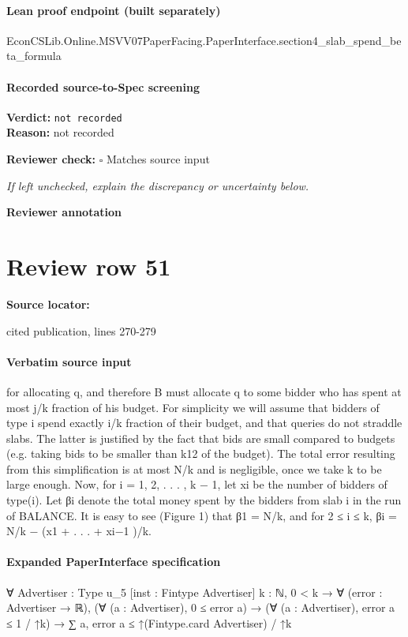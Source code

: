 \documentclass[10pt]{article}
\newcommand{\reviewerbox}{%
  \par\noindent\fbox{\parbox{0.96\linewidth}{\rule{0pt}{0.38in}}}\par
}
\newcommand{\reviewmatch}[1]{%
  \par\noindent\textbf{Reviewer check:} $\square$\; #1\par
  \noindent\emph{If left unchecked, explain the discrepancy or uncertainty below.}\par
}
\begin{document}
\paragraph{Lean proof endpoint (built separately)}\begin{ReviewVerbatim}
EconCSLib.Online.MSVV07PaperFacing.PaperInterface.section4_slab_spend_beta_formula
\end{ReviewVerbatim}

\paragraph{Recorded source-to-Spec screening}
\textbf{Verdict:} \texttt{not recorded}
\\
\textbf{Reason:} not recorded
\reviewmatch{Matches source input}
\noindent\textbf{Reviewer annotation}\par
\reviewerbox
\clearpage
\hypertarget{source-claim-cde484128ac64433}{}
\section*{Review row 51}
\textbf{Source locator:} {\footnotesize\raggedright cited publication, lines 270-\allowbreak{}279\par}
\paragraph{Verbatim source input}
\begin{ReviewVerbatim}
for allocating q, and therefore B must allocate q to some bidder who has spent at most j/k
fraction of his budget.
For simplicity we will assume that bidders of type i spend exactly i/k fraction of their budget,
and that queries do not straddle slabs. The latter is justified by the fact that bids are small
compared to budgets (e.g. taking bids to be smaller than k12 of the budget). The total error
resulting from this simplification is at most N/k and is negligible, once we take k to be large
enough. Now, for i = 1, 2, . . . , k − 1, let xi be the number of bidders of type(i). Let βi denote
the total money spent by the bidders from slab i in the run of BALANCE. It is easy to see
(Figure 1) that β1 = N/k, and for 2 ≤ i ≤ k, βi = N/k − (x1 + . . . + xi−1 )/k.
\end{ReviewVerbatim}


\paragraph{Expanded PaperInterface specification}
\begin{ReviewVerbatim}
∀ {Advertiser : Type u_5} [inst : Fintype Advertiser] {k : ℕ},
  0 < k →
    ∀ (error : Advertiser → ℝ),
      (∀ (a : Advertiser), 0 ≤ error a) →
        (∀ (a : Advertiser), error a ≤ 1 / ↑k) → ∑ a, error a ≤ ↑(Fintype.card Advertiser) / ↑k
\end{ReviewVerbatim}
\end{document}
